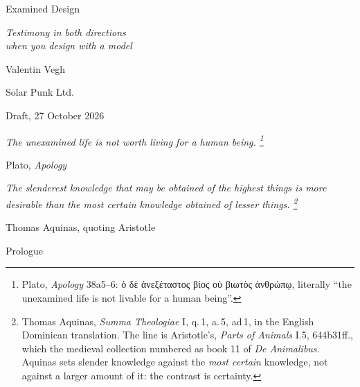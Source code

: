 \documentclass[11pt,a4paper]{article}
\newcommand{\gr}[1]{{\greekfont #1}}
\newcounter{art}
\begin{document}
\thispagestyle{empty}
\vspace*{30mm}
{\centering
  {\Huge Examined Design}\par\vspace{5mm}
  {\large\itshape Testimony in both directions\\ when you design with a model}\par\vspace{12mm}
  Valentin Vegh\par\vspace{1mm}
  {\small Solar Punk Ltd.}\par\vspace{1mm}
  {\small\color{muted} Draft, 27 October 2026}\par
}
\vspace{24mm}

\begin{center}
\begin{minipage}{0.72\textwidth}
\itshape
The unexamined life is not worth living for a human being.%
\footnote{Plato, \textit{Apology} 38a5--6: \gr{ὁ δὲ ἀνεξέταστος βίος οὐ βιωτὸς ἀνθρώπῳ}, literally ``the unexamined life is not livable for a human being''.}
\par\vspace{1mm}\hfill\upshape\small Plato, \textit{Apology}
\par\vspace{8mm}\itshape
The slenderest knowledge that may be obtained of the highest things is more desirable than the most certain knowledge obtained of lesser things.%
\footnote{Thomas Aquinas, \textit{Summa Theologiae} I, q.\,1, a.\,5, ad\,1, in the English Dominican translation. The line is Aristotle's, \textit{Parts of Animals} I.5, 644b31ff., which the medieval collection numbered as book 11 of \textit{De Animalibus}. Aquinas sets slender knowledge against the \emph{most certain} knowledge, not against a larger amount of it: the contrast is certainty.}
\par\vspace{1mm}\hfill\upshape\small Thomas Aquinas, quoting Aristotle
\end{minipage}
\end{center}

\clearpage

{\centering\Large Prologue\par}
\vspace{4mm}
\end{document}
